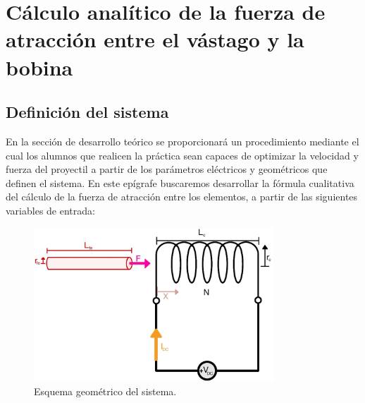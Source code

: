 \section{Cálculo analítico de la fuerza de atracción entre el vástago y la bobina}
\label{sec:analitico}

\subsection{Definición del sistema}
En la sección de desarrollo teórico se proporcionará un procedimiento mediante el cual los alumnos que realicen la práctica sean capaces de optimizar la velocidad y fuerza del proyectil a partir de los parámetros eléctricos y geométricos que definen el sistema. En este epígrafe buscaremos desarrollar la fórmula cualitativa del cálculo de la fuerza de atracción entre los elementos, a partir de las siguientes variables de entrada:

\begin{figure}[H]
    \centering 
    \includegraphics[width=9cm]{FigurasMemoria/esquemaDesTeor.jpg}
    \caption{Esquema geométrico del sistema.}
    \label{fig:esquemaDesTeor} %
\end{figure}

